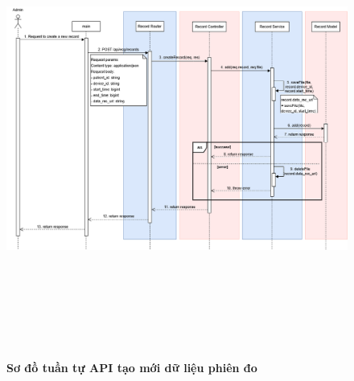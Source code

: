 \begin{figure}[H]
	\centering
	\includegraphics[width=15cm,height=15cm]{Images/api_sequence/record/createRecord.drawio.png}
	\caption[Sơ đồ tuần tự API tạo mới dữ liệu phiên đo]{\bfseries \fontsize{12pt}{0pt}\selectfont Sơ đồ tuần tự API tạo mới dữ liệu phiên đo}
	\label{sequence_diagram_create_record}
\end{figure}

